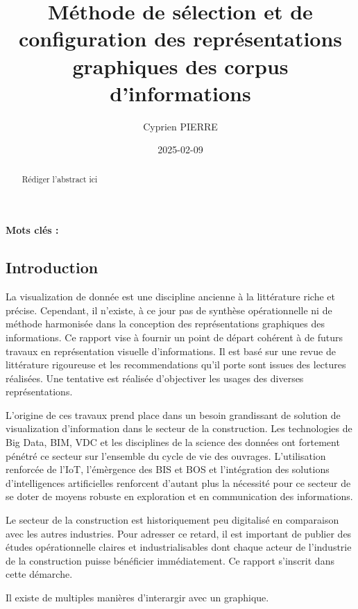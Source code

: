 \documentclass[a4paper,12pt]{article}
\author{Cyprien PIERRE \orcidlink{0009-0009-9040-6795}}
\date{2025-02-09}
\title{Méthode de sélection et de configuration des représentations graphiques des corpus d'informations}
\begin{document}
\maketitle
\begin{abstract}
Rédiger l'abstract ici
\end{abstract}

\renewcommand\{\keywordsname\{\textbf{Mots clés : }

\begin{multicols}{2}
\section*{Introduction}
\label{sec:org1560612}
La visualization de donnée est une discipline ancienne à la littérature riche et précise. Cependant, il n'existe, à ce jour pas de synthèse opérationnelle ni de méthode harmonisée dans la conception des représentations graphiques des informations. Ce rapport vise à fournir un point de départ cohérent à de futurs travaux en représentation visuelle d'informations. Il est basé sur une revue de littérature rigoureuse et les recommendations qu'il porte sont issues des lectures réalisées. Une tentative est réalisée d'objectiver les usages des diverses représentations.

L'origine de ces travaux prend place dans un besoin grandissant de solution de visualization d'information dans le secteur de la construction. Les technologies de Big Data, BIM, VDC et les disciplines de la science des données ont fortement pénétré ce secteur sur l'ensemble du cycle de vie des ouvrages. \autocite{asiauniversitytaichungtaiwanResearchApplicationFunctiontechnologyaesthetics2020} L'utilisation renforcée de l'IoT, l'émèrgence des BIS et BOS et l'intégration des solutions d'intelligences artificielles renforcent d'autant plus la nécessité pour ce secteur de se doter de moyens robuste en exploration et en communication des informations.

Le secteur de la construction est historiquement peu digitalisé en comparaison avec les autres industries. Pour adresser ce retard, il est important de publier des études opérationnelle claires et industrialisables dont chaque acteur de l'industrie de la construction puisse bénéficier immédiatement. Ce rapport s'inscrit dans cette démarche.

Il existe de multiples manières d'interargir avec un graphique. \autocite{schwabishCenteringAccessibilityData2022a,frankelavskyRightToolsJob2022}


\end{multicols}
\end{document}
